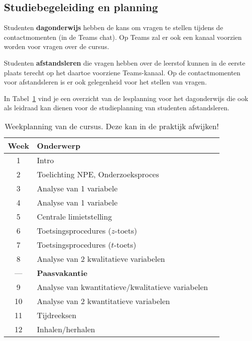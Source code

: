 \subsection{Studiebegeleiding en planning}

Studenten \textbf{dagonderwijs} hebben de kans om vragen te stellen tijdens de contactmomenten (in de Teams chat). Op Teams zal er ook een kanaal voorzien worden voor vragen over de cursus.

Studenten \textbf{afstandsleren} die vragen hebben over de leerstof kunnen in de eerste plaats terecht op het daartoe voorziene Teams-kanaal. Op de contactmomenten voor afstandsleren is er ook gelegenheid voor het stellen van vragen.

In Tabel~\ref{tab:weekplanning} vind je een overzicht van de lesplanning voor het dagonderwijs die ook als leidraad kan dienen voor de studieplanning van studenten afstandsleren.

\begin{table}
  \begin{center}
    \begin{tabular}{cll}
      \toprule
      \textbf{Week} & \textbf{Onderwerp}                                \\
      \midrule
      1             & Intro                                             \\
      2             & Toelichting NPE, Onderzoeksproces                 \\
      3             & Analyse van 1 variabele                           \\
      4             & Analyse van 1 variabele                           \\
      5             & Centrale limietstelling                           \\
      6             & Toetsingsprocedures ($z$-toets)                   \\
      7             & Toetsingsprocedures ($t$-toets)                   \\
      8             & Analyse van 2 kwalitatieve variabelen             \\
      ---           & \textbf{Paasvakantie}                             \\
      9             & Analyse van kwantitatieve/kwalitatieve variabelen \\
      10            & Analyse van 2 kwantitatieve variabelen            \\
      11            & Tijdreeksen                                       \\
      12            & Inhalen/herhalen                                  \\
      \bottomrule
    \end{tabular}
    \caption[Weekplanning]{Weekplanning van de cursus. Deze kan in de praktijk afwijken!}
    \label{tab:weekplanning}
  \end{center}
\end{table}

